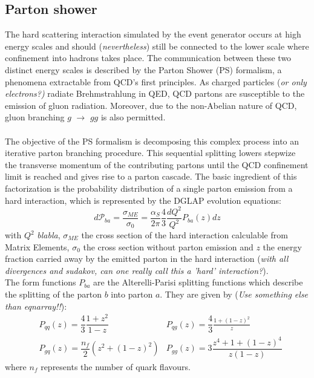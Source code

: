 \subsection{Parton shower} \label{sec::PS}
The hard scattering interaction simulated by the event generator occurs at high energy scales and should (\textit{nevertheless}) still be connected to the lower scale where confinement into hadrons takes place. The communication between these two distinct energy scales is described by the Parton Shower (PS) formalism, a phenomena extractable from QCD's first principles.
As charged particles (\textit{or only electrons?)} radiate Brehmstrahlung in QED, QCD partons are susceptible to the emission of gluon radiation. Moreover, due to the non-Abelian nature of QCD, gluon branching $g$ $\rightarrow$ $gg$ is also permitted.\\
\\
The objective of the PS formalism is decomposing this complex process into an iterative parton branching procedure. This sequential splitting lowers stepwize the transverse momentum of the contributing partons until the QCD confinement limit is reached and gives rise to a parton cascade. The basic ingredient of this factorization is the probability distribution of a single parton emission from a hard interaction, which is represented by the DGLAP evolution equations:
\begin{equation}\label{eq::PSProb_NoSudakov}
 d\mathcal{P}_{ba} = \dfrac{\sigma_{ME}}{\sigma_{0}} = \dfrac{\alpha_{S}}{2\pi} \frac{4}{3} \frac{dQ^{2}}{Q^{2}} P_{ba}(z)dz
\end{equation}
with $Q^{2}$ \textit{blabla}, $\sigma_{ME}$ the cross section of the hard interaction calculable from Matrix Elements, $\sigma_{0}$ the cross section without parton emission and $z$ the energy fraction carried away by the emitted parton in the hard interaction (\textit{with all divergences and sudakov, can one really call this a 'hard' interaction?}).\\
The form functions $P_{ba}$ are the Alterelli-Parisi splitting functions which describe the splitting of the parton $b$ into parton $a$. They are given by (\textit{Use something else than eqnarray!!}):
\begin{eqnarray}
 & P_{qq}(z) = \dfrac{4}{3} \dfrac{1+z^{2}}{1-z} & P_{qg}(z) = \dfrac{4}{3} \frac{1+(1-z)^{2}}{z} \\
 & P_{gq}(z) = \dfrac{n_{f}}{2} (z^{2} + (1-z)^{2}) & P_{gg}(z) = 3 \dfrac{z^{4}+1+(1-z)^{4}}{z(1-z)}
\end{eqnarray}
where $n_{f}$ represents the number of quark flavours.

